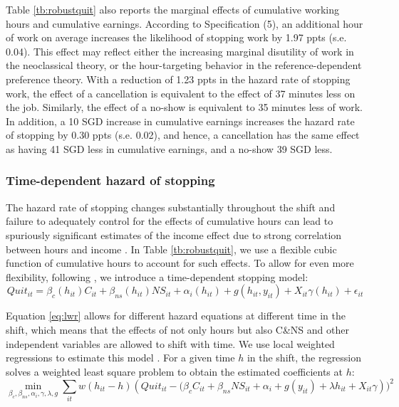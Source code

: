 \documentclass[reviewmode,AEJ]{AEA}
\begin{document}
Table \ref{tb:robustquit} also reports the marginal effects of cumulative working hours and cumulative earnings. According to Specification (5), an additional hour of work on average increases the likelihood of stopping work by 1.97 ppts (s.e. 0.04). This effect may reflect either the increasing marginal disutility of work in the neoclassical theory, or the hour-targeting behavior in the reference-dependent preference theory. With a reduction of 1.23 ppts in the hazard rate of stopping work, the effect of a cancellation is equivalent to the effect of 37 minutes less on the job. Similarly, the effect of a no-show is equivalent to 35 minutes less of work. In addition, a 10 SGD increase in cumulative earnings increases the hazard rate of stopping by 0.30 ppts (s.e. 0.02), and hence, a cancellation has the same effect as having 41 SGD less in cumulative earnings, and a no-show 39 SGD less.

\subsubsection{Time-dependent hazard of stopping}
The hazard rate of stopping changes substantially throughout the shift and failure to adequately control for the effects of cumulative hours can lead to spuriously significant estimates of the income effect due to strong correlation between hours and income \citep{thakral2018daily}. In Table \ref{tb:robustquit}, we use a flexible cubic function of cumulative hours to account for such effects. To allow for even more flexibility, following \cite{thakral2018daily}, we introduce a time-dependent stopping model:
\begin{equation}
\label{eq:lwr}
    Quit_{it} = \beta_c(h_{it})C_{it} + \beta_{ns}(h_{it}){NS}_{it} + \alpha_i(h_{it}) + g(h_{it}, y_{it}) + X_{it}\gamma(h_{it}) + \epsilon_{it}
\end{equation}

Equation \eqref{eq:lwr} allows for different hazard equations at different time in the shift, which means that the effects of not only hours but also C\&NS and other independent variables are allowed to shift with time. We use local weighted regressions to estimate this model \citep{cleveland1988locally}. For a given time $h$ in the shift, the regression solves a weighted least square problem to obtain the estimated coefficients at $h$:
\[\min_{\beta_c, \beta_{ns}, \alpha_i, \gamma, \lambda, g} \sum_{it} w(h_{it}-h) \left(Quit_{it} - (\beta_cC_{it} + \beta_{ns}{NS}_{it} + \alpha_i + g(y_{it}) + \lambda h_{it} + X_{it}\gamma\right))^2\]
\end{document}
